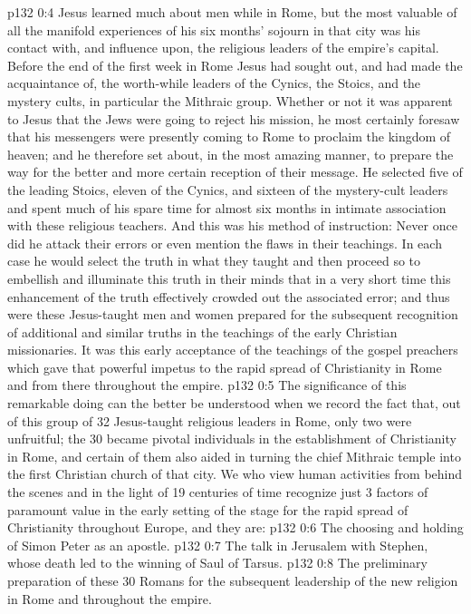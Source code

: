 \vs p132 0:4 Jesus learned much about men while in Rome, but the most valuable of all the manifold experiences of his six months’ sojourn in that city was his contact with, and influence upon, the religious leaders of the empire’s capital. Before the end of the first week in Rome Jesus had sought out, and had made the acquaintance of, the worth\hyp{}while leaders of the Cynics, the Stoics, and the mystery cults, in particular the Mithraic group. Whether or not it was apparent to Jesus that the Jews were going to reject his mission, he most certainly foresaw that his messengers were presently coming to Rome to proclaim the kingdom of heaven; and he therefore set about, in the most amazing manner, to prepare the way for the better and more certain reception of their message. He selected five of the leading Stoics, eleven of the Cynics, and sixteen of the mystery\hyp{}cult leaders and spent much of his spare time for almost six months in intimate association with these religious teachers. And this was his method of instruction: Never once did he attack their errors or even mention the flaws in their teachings. In each case he would select the truth in what they taught and then proceed so to embellish and illuminate this truth in their minds that in a very short time this enhancement of the truth effectively crowded out the associated error; and thus were these Jesus\hyp{}taught men and women prepared for the subsequent recognition of additional and similar truths in the teachings of the early Christian missionaries. It was this early acceptance of the teachings of the gospel preachers which gave that powerful impetus to the rapid spread of Christianity in Rome and from there throughout the empire.
\vs p132 0:5 The significance of this remarkable doing can the better be understood when we record the fact that, out of this group of 32 Jesus\hyp{}taught religious leaders in Rome, only two were unfruitful; the 30 became pivotal individuals in the establishment of Christianity in Rome, and certain of them also aided in turning the chief Mithraic temple into the first Christian church of that city. We who view human activities from behind the scenes and in the light of 19 centuries of time recognize just 3 factors of paramount value in the early setting of the stage for the rapid spread of Christianity throughout Europe, and they are:
\vs p132 0:6 \bibnobreakspace The choosing and holding of Simon Peter as an apostle.
\vs p132 0:7 \bibnobreakspace The talk in Jerusalem with Stephen, whose death led to the winning of Saul of Tarsus.
\vs p132 0:8 \bibnobreakspace The preliminary preparation of these 30 Romans for the subsequent leadership of the new religion in Rome and throughout the empire.
